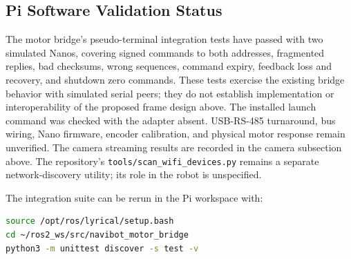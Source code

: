 \subsection{Pi Software Validation Status}
The motor bridge's pseudo-terminal integration tests have passed with two simulated Nanos, covering signed commands to both addresses, fragmented replies, bad checksums, wrong sequences, command expiry, feedback loss and recovery, and shutdown zero commands. These tests exercise the existing bridge behavior with simulated serial peers; they do not establish implementation or interoperability of the proposed frame design above. The installed launch command was checked with the adapter absent. USB-RS-485 turnaround, bus wiring, Nano firmware, encoder calibration, and physical motor response remain unverified. The camera streaming results are recorded in the camera subsection above. The repository's \texttt{tools/scan\_wifi\_devices.py} remains a separate network-discovery utility; its role in the robot is unspecified.

The integration suite can be rerun in the Pi workspace with:
\begin{lstlisting}[language=bash]
source /opt/ros/lyrical/setup.bash
cd ~/ros2_ws/src/navibot_motor_bridge
python3 -m unittest discover -s test -v
\end{lstlisting}
